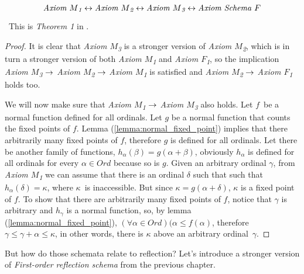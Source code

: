 \begin{theorem}
\begin{equation}
\emph{Axiom $M$\textsubscript{1}} \iff \emph{Axiom $M$\textsubscript{2}} \iff \emph{Axiom $M$\textsubscript{3}} \iff \emph{Axiom Schema $F$}
\end{equation}
\end{theorem}
\
This is \emph{Theorem 1} in \cite{Levy60a}.\\
\begin{proof} %
It is clear that \emph{Axiom $M$\textsubscript{3}} is a stronger version of \emph{Axiom $M$\textsubscript{2}}, which is in turn a stronger version of both \emph{Axiom $M$\textsubscript{1}} and \emph{Axiom $F$\textsubscript{1}}, so the implication \emph{Axiom $M$\textsubscript{3}} $\then$ \emph{Axiom $M$\textsubscript{2}} $\then$ \emph{Axiom $M$\textsubscript{1}} is satisfied and \emph{Axiom $M$\textsubscript{2}} $\then$ \emph{Axiom $F$\textsubscript{1}} holds too.

We will now make sure that  \emph{Axiom $M$\textsubscript{1}} $\then$  \emph{Axiom $M$\textsubscript{3}} also holds. 
Let $f$ be a normal function defined for all ordinals. %
Let $g$ be a normal function that counts the fixed points of $f$. Lemma (\ref{lemma:normal_fixed_point}) implies that there arbitrarily many fixed points of $f$, therefore $g$ is defined for all ordinals. Let there be another family of functions, $h_\alpha(\beta) = g(\alpha+\beta)$, obviously $h_\alpha$ is defined for all ordinals for every $\alpha \in Ord$ because so is $g$. Given an arbitrary ordinal $\gamma$, from \emph{Axiom $M$\textsubscript{1}} we can assume that there is an ordinal $\delta$ such that such that $h_\alpha(\delta) = \kappa$, where $\kappa$ is inaccessible. 
But since $\kappa = g(\alpha+\delta)$, $\kappa$ is a fixed point of $f$. To show that there are arbitrarily many fixed points of $f$, notice that $\gamma$ is arbitrary and $h_\gamma$ is a normal function, so, by lemma (\ref{lemma:normal_fixed_point}), $(\forall \alpha \in Ord)(\alpha \leq f(\alpha)$, therefore $\gamma \leq \gamma + \alpha \leq \kappa$, in other words, there is $\kappa$ above an arbitrary ordinal $\gamma$.

\end{proof}

But how do those schemata relate to reflection? Let's introduce a stronger version of \emph{First-order reflection schema} from the previous chapter.

